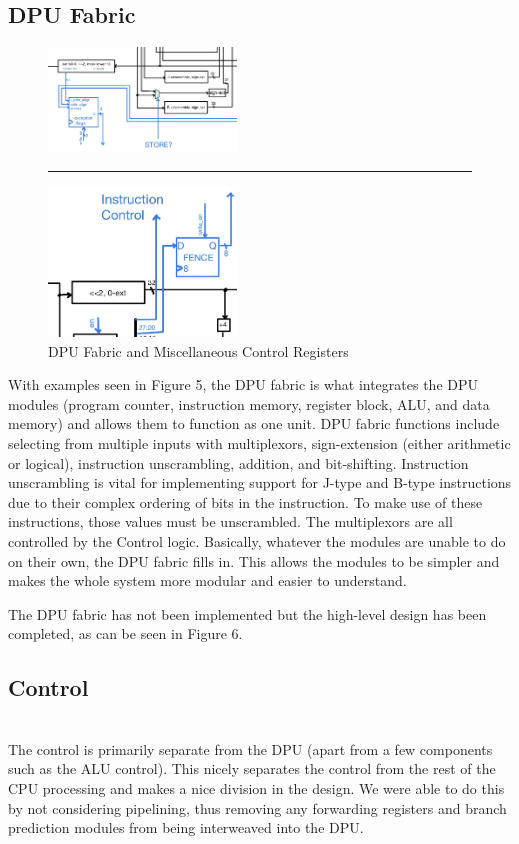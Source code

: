 \documentclass[lettersize,journal]{IEEEtran}
\begin{document}
\subsection{DPU Fabric}
\begin{figure}[!h]
  \label{fig:dpumisc}
  \centering
  \includegraphics[width=5cm]{Misc1.jpg}
  \rule{7cm}{0.8pt}
  \includegraphics[width=5cm]{Misc2.jpg}
  \caption{DPU Fabric and Miscellaneous Control Registers}
\end{figure}
With examples seen in Figure 5, the DPU fabric is what integrates the DPU modules (program counter, instruction memory, register block, ALU, and data memory) and allows them to function as one unit.
DPU fabric functions include selecting from multiple inputs with multiplexors, sign-extension (either arithmetic or logical), instruction unscrambling, addition, and bit-shifting.
Instruction unscrambling is vital for implementing support for J-type and B-type instructions due to their complex ordering of bits in the instruction.
To make use of these instructions, those values must be unscrambled.
The multiplexors are all controlled by the Control logic.
Basically, whatever the modules are unable to do on their own, the DPU fabric fills in.
This allows the modules to be simpler and makes the whole system more modular and easier to understand.

The DPU fabric has not been implemented but the high-level design has been completed, as can be seen in Figure 6.

\subsection{Control}
\color{red}{Incomplete...}\color{black}\\
The control is primarily separate from the DPU (apart from a few components such as the ALU control).
This nicely separates the control from the rest of the CPU processing and makes a nice division in the design.
We were able to do this by not considering pipelining, thus removing any forwarding registers and branch prediction modules from being interweaved into the DPU.
\end{document}
